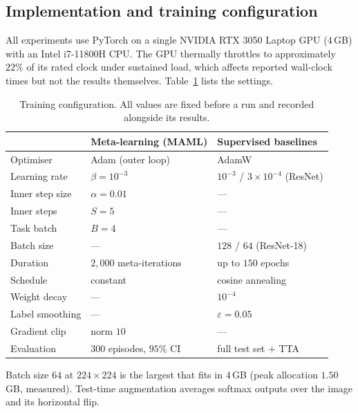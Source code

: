 \documentclass[11pt,a4paper]{article}
\begin{document}
\subsection{Implementation and training configuration}
All experiments use PyTorch on a single NVIDIA RTX 3050 Laptop GPU ($4$\,GB)
with an Intel i7-11800H CPU. The GPU thermally throttles to approximately
$22\%$ of its rated clock under sustained load, which affects reported
wall-clock times but not the results themselves. Table~\ref{tab:hyper} lists
the settings.

\begin{table}[htbp]
\centering
\small
\begin{tabular}{lll}
\toprule
& \textbf{Meta-learning (MAML)} & \textbf{Supervised baselines} \\
\midrule
Optimiser        & Adam (outer loop)         & AdamW \\
Learning rate    & $\beta = 10^{-3}$         & $10^{-3}$ / $3\times10^{-4}$ (ResNet) \\
Inner step size  & $\alpha = 0.01$           & --- \\
Inner steps      & $S = 5$                   & --- \\
Task batch       & $B = 4$                   & --- \\
Batch size       & ---                       & $128$ / $64$ (ResNet-18) \\
Duration         & $2{,}000$ meta-iterations & up to $150$ epochs \\
Schedule         & constant                  & cosine annealing \\
Weight decay     & ---                       & $10^{-4}$ \\
Label smoothing  & ---                       & $\varepsilon = 0.05$ \\
Gradient clip    & norm $10$                 & --- \\
Evaluation       & $300$ episodes, $95\%$ CI & full test set $+$ TTA \\
\bottomrule
\end{tabular}
\caption{Training configuration. All values are fixed before a run and recorded
alongside its results.}
\label{tab:hyper}
\end{table}

Batch size $64$ at $224\times224$ is the largest that fits in $4$\,GB (peak
allocation $1.50$\,GB, measured). Test-time augmentation averages softmax
outputs over the image and its horizontal flip.
\end{document}
